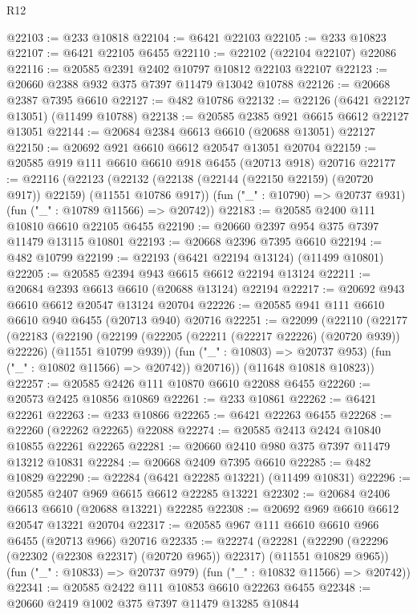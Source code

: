 \begin{lexlean}{R12}
\begin{coremodule}
@22103 := @233 @10818
@22104 := @6421 @22103
@22105 := @233 @10823
@22107 := @6421 @22105 @6455
@22110 := @22102 (@22104 @22107) @22086
@22116 := @20585 @2391 @2402 @10797 @10812 @22103 @22107
@22123 := @20660 @2388 @932 @375 @7397 @11479 @13042 @10788
@22126 := @20668 @2387 @7395 @6610
@22127 := @482 @10786
@22132 := @22126 (@6421 @22127 @13051) (@11499 @10788)
@22138 := @20585 @2385 @921 @6615 @6612 @22127 @13051
@22144 := @20684 @2384 @6613 @6610 (@20688 @13051) @22127
@22150 := @20692 @921 @6610 @6612 @20547 @13051 @20704
@22159 := @20585 @919 @111 @6610 @6610 @918 @6455 (@20713 @918) @20716
@22177 := @22116
    (@22123
      (@22132 (@22138 (@22144 (@22150 @22159) (@20720 @917)) @22159) (@11551 @10786 @917))
      (fun ("_" : @10790) => @20737 @931)
      (fun ("_" : @10789 @11566) => @20742))
@22183 := @20585 @2400 @111 @10810 @6610 @22105 @6455
@22190 := @20660 @2397 @954 @375 @7397 @11479 @13115 @10801
@22193 := @20668 @2396 @7395 @6610
@22194 := @482 @10799
@22199 := @22193 (@6421 @22194 @13124) (@11499 @10801)
@22205 := @20585 @2394 @943 @6615 @6612 @22194 @13124
@22211 := @20684 @2393 @6613 @6610 (@20688 @13124) @22194
@22217 := @20692 @943 @6610 @6612 @20547 @13124 @20704
@22226 := @20585 @941 @111 @6610 @6610 @940 @6455 (@20713 @940) @20716
@22251 := @22099
    (@22110
      (@22177
        (@22183
          (@22190
            (@22199 (@22205 (@22211 (@22217 @22226) (@20720 @939)) @22226) (@11551 @10799 @939))
            (fun ("_" : @10803) => @20737 @953)
            (fun ("_" : @10802 @11566) => @20742))
          @20716))
      (@11648 @10818 @10823))
@22257 := @20585 @2426 @111 @10870 @6610 @22088 @6455
@22260 := @20573 @2425 @10856 @10869
@22261 := @233 @10861
@22262 := @6421 @22261
@22263 := @233 @10866
@22265 := @6421 @22263 @6455
@22268 := @22260 (@22262 @22265) @22088
@22274 := @20585 @2413 @2424 @10840 @10855 @22261 @22265
@22281 := @20660 @2410 @980 @375 @7397 @11479 @13212 @10831
@22284 := @20668 @2409 @7395 @6610
@22285 := @482 @10829
@22290 := @22284 (@6421 @22285 @13221) (@11499 @10831)
@22296 := @20585 @2407 @969 @6615 @6612 @22285 @13221
@22302 := @20684 @2406 @6613 @6610 (@20688 @13221) @22285
@22308 := @20692 @969 @6610 @6612 @20547 @13221 @20704
@22317 := @20585 @967 @111 @6610 @6610 @966 @6455 (@20713 @966) @20716
@22335 := @22274
    (@22281
      (@22290 (@22296 (@22302 (@22308 @22317) (@20720 @965)) @22317) (@11551 @10829 @965))
      (fun ("_" : @10833) => @20737 @979)
      (fun ("_" : @10832 @11566) => @20742))
@22341 := @20585 @2422 @111 @10853 @6610 @22263 @6455
@22348 := @20660 @2419 @1002 @375 @7397 @11479 @13285 @10844

\end{coremodule}
\end{lexlean}
